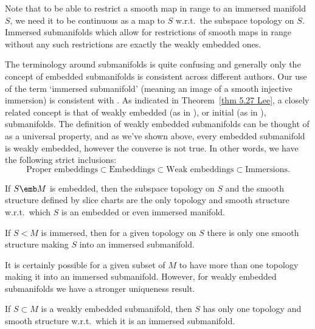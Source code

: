 Note that to be able to restrict a smooth map in range to an immersed manifold $S$, we need it to be continuous as a map to $S$ w.r.t.\ the subspace topology on $S$. Immersed submanifolds which allow for restrictions of smooth maps in range without any such restrictions are exactly the weakly embedded ones.

\begin{rem}
    The terminology around submanifolds is quite confusing and generally only the concept of embedded submanifolds is consistent across different authors. Our use of the term `immersed submanifold' (meaning an image of a smooth injective immersion) is consistent with \cite{Lee}. As indicated in Theorem~\ref{thm 5.27 Lee}, a closely related concept is that of weakly embedded (as in \cite{Lee}), or initial (as in \cite{RS1}), submanifolds. The definition of weakly embedded submanifolds can be thought of as a universal property, and as we've shown above, every embedded submanifold is weakly embedded, however the converse is not true. In other words, we have the following strict inclusions:
    \[\text{Proper embeddings}\subset \text{Embeddings}\subset\text{Weak embeddings}\subset\text{Immersions}.\]
\end{rem}

\begin{thm}\label{thm 5.31 Lee}
    If $S\emb M$ is embedded, then the subspace topology on $S$ and the smooth structure defined by slice charts are the only topology and smooth structure w.r.t.\ which $S$ is an embedded or even immersed manifold.
\end{thm}

\begin{thm}\label{thm 5.32 Lee}
    If $S< M$ is immersed, then for a given topology on $S$ there is only one smooth structure making $S$ into an immersed submanifold.
\end{thm}

It is certainly possible for a given subset of $M$ to have more than one topology making it into an immersed submanifold. However, for weakly embedded submanifolds we have a stronger uniqueness result.

\begin{thm}\label{thm 5.33 Lee}
    If $S\subset M$ is a weakly embedded submanifold, then $S$ has only one topology and smooth structure w.r.t.\ which it is an immersed submanifold.
\end{thm}


